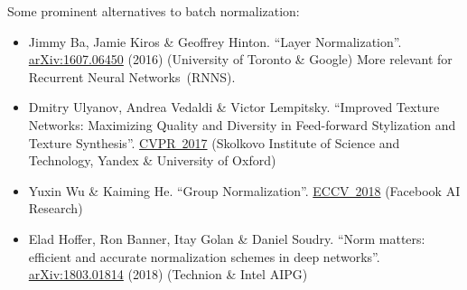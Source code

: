 \documentclass{article}
\begin{document}
\begin{thebibliography}{10}
 Some prominent alternatives to batch normalization:
\begin{itemize}
\item Jimmy Ba, Jamie Kiros \& Geoffrey Hinton. ``Layer Normalization''. \href{https://arxiv.org/pdf/1607.06450.pdf}{arXiv:1607.06450} (2016) (University of Toronto \& Google)  More relevant for Recurrent Neural Networks~(RNNS).
\item Dmitry Ulyanov, Andrea Vedaldi \& Victor Lempitsky. ``Improved Texture Networks: Maximizing Quality and Diversity in Feed-forward Stylization and Texture Synthesis''. \href{http://openaccess.thecvf.com/content_cvpr_2017/papers/Ulyanov_Improved_Texture_Networks_CVPR_2017_paper.pdf}{CVPR~2017} (Skolkovo Institute of Science and Technology, Yandex \& University of Oxford)
\item Yuxin Wu \& Kaiming He. ``Group Normalization''. \href{https://arxiv.org/pdf/1803.08494.pdf}{ECCV~2018} (Facebook AI Research)
\item Elad Hoffer, Ron Banner, Itay Golan \& Daniel Soudry. ``Norm matters: efficient and accurate normalization schemes in deep networks''. \href{https://arxiv.org/pdf/1803.01814.pdf}{arXiv:1803.01814} (2018) (Technion \& Intel AIPG)
\end{itemize}

\end{thebibliography}

\newpage
\end{document}
